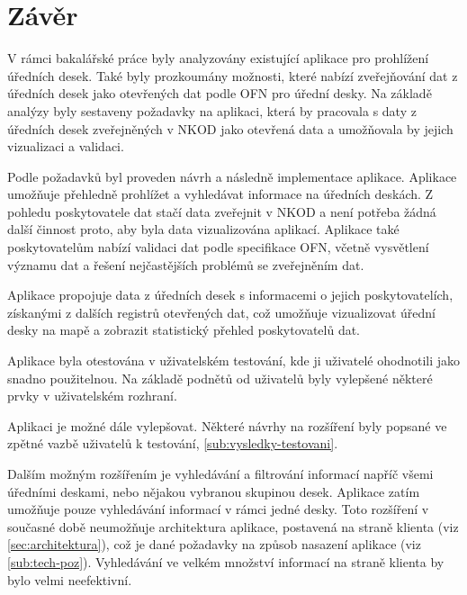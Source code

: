 \chapter*{Závěr}

V rámci bakalářské práce byly analyzovány existující aplikace pro prohlížení úředních desek. Také byly prozkoumány možnosti, které nabízí zveřejňování dat z úředních desek jako otevřených dat podle OFN pro úřední desky. Na základě analýzy byly sestaveny požadavky na aplikaci, která by pracovala s daty z úředních desek zveřejněných v NKOD jako otevřená data a umožňovala by jejich vizualizaci a validaci.

Podle požadavků byl proveden návrh a následně implementace aplikace. Aplikace umožňuje přehledně prohlížet a vyhledávat informace na úředních deskách. Z pohledu poskytovatele dat stačí data zveřejnit v NKOD a není potřeba žádná další činnost proto, aby byla data vizualizována aplikací. Aplikace také poskytovatelům nabízí validaci dat podle specifikace OFN, včetně vysvětlení významu dat a řešení nejčastějších problémů se zveřejněním dat.

Aplikace propojuje data z úředních desek s informacemi o jejich poskytovatelích, získanými z dalších registrů otevřených dat, což umožňuje vizualizovat úřední desky na mapě a zobrazit statistický přehled poskytovatelů dat.

Aplikace byla otestována v uživatelském testování, kde ji uživatelé ohodnotili jako snadno použitelnou. Na základě podnětů od uživatelů byly vylepšené některé prvky v uživatelském rozhraní.

Aplikaci je možné dále vylepšovat. Některé návrhy na rozšíření byly popsané ve zpětné vazbě uživatelů k testování, \autoref{sub:vysledky-testovani}. 

Dalším možným rozšířením je vyhledávání a filtrování informací napříč všemi úředními deskami, nebo nějakou vybranou skupinou desek. Aplikace zatím umožňuje pouze vyhledávání informací v rámci jedné desky. Toto rozšíření v současné době neumožňuje architektura aplikace, postavená na straně klienta (viz \autoref{sec:architektura}), což je dané požadavky na způsob nasazení aplikace (viz \autoref{sub:tech-poz}). Vyhledávání ve velkém množství informací na straně klienta by bylo velmi neefektivní.